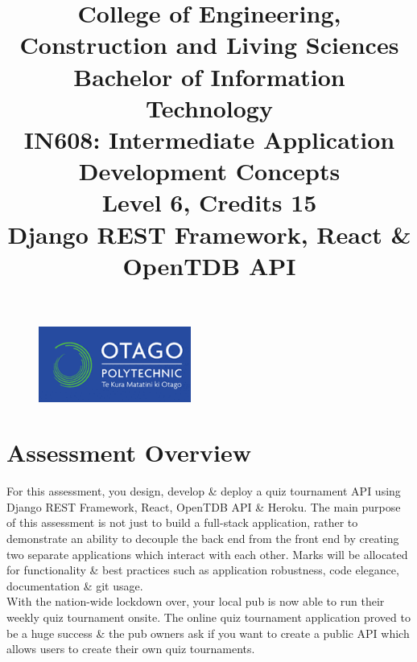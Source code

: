 \documentclass{article}
\author{}
\begin{document}
\begin{figure}
	\centering
	\includegraphics[width=50mm]{./img/logo.png}
\end{figure}

\title{College of Engineering, Construction and Living Sciences\\Bachelor of Information Technology\\IN608: Intermediate Application Development Concepts\\Level 6, Credits 15\\\textbf{Django REST Framework, React \& OpenTDB API}}
\date{}
\maketitle

\section*{Assessment Overview} 
For this assessment, you design, develop \& deploy a quiz tournament API using Django REST Framework, React, OpenTDB API \& Heroku. The main purpose of this assessment is not just to build a full-stack application, rather to demonstrate an ability to decouple the back end from the front end by creating two separate applications which interact with each other. Marks will be allocated for functionality \& best practices such as application robustness, code elegance, documentation \& git usage. \\

With the nation-wide lockdown over, your local pub is now able to run their weekly quiz tournament onsite. The online quiz tournament application proved to be a huge success \& the pub owners ask if you want to create a public API which allows users to create their own quiz tournaments.
\end{document}
